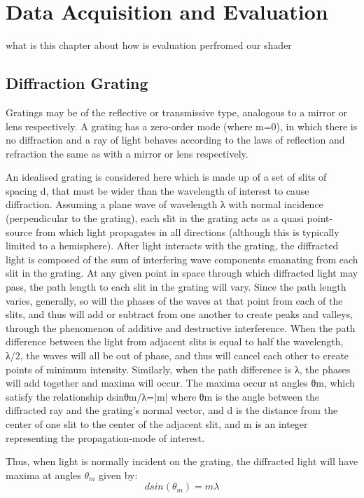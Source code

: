 \section{Data Acquisition and Evaluation}
what is this chapter about
how is evaluation perfromed
our shader


\subsection{Diffraction Grating}
Gratings may be of the reflective or transmissive type, analogous to a mirror or lens respectively. A grating has a zero-order mode (where m=0), in which there is no diffraction and a ray of light behaves according to the laws of reflection and refraction the same as with a mirror or lens respectively.

An idealised grating is considered here which is made up of a set of slits of spacing d, that must be wider than the wavelength of interest to cause diffraction. Assuming a plane wave of wavelength λ with normal incidence (perpendicular to the grating), each slit in the grating acts as a quasi point-source from which light propagates in all directions (although this is typically limited to a hemisphere). After light interacts with the grating, the diffracted light is composed of the sum of interfering wave components emanating from each slit in the grating. At any given point in space through which diffracted light may pass, the path length to each slit in the grating will vary. Since the path length varies, generally, so will the phases of the waves at that point from each of the slits, and thus will add or subtract from one another to create peaks and valleys, through the phenomenon of additive and destructive interference. When the path difference between the light from adjacent slits is equal to half the wavelength, λ/2, the waves will all be out of phase, and thus will cancel each other to create points of minimum intensity. Similarly, when the path difference is λ, the phases will add together and maxima will occur. The maxima occur at angles θm, which satisfy the relationship dsinθm/λ=|m| where θm is the angle between the diffracted ray and the grating's normal vector, and d is the distance from the center of one slit to the center of the adjacent slit, and m is an integer representing the propagation-mode of interest.


Thus, when light is normally incident on the grating, the diffracted light will have maxima at angles $\theta_m$ given by:
\begin{equation*}
d sin(\theta_m) = m\lambda
\end{equation*}

